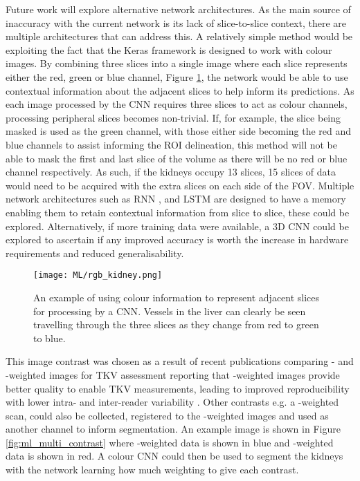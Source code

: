 Future work will explore alternative network architectures. As the main source of inaccuracy with the current network is its lack of slice-to-slice context, there are multiple architectures that can address this. A relatively simple method would be exploiting the fact that the Keras framework is designed to work with colour images. By combining three slices into a single image where each slice represents either the red, green or blue channel, Figure \ref{fig:ml_rgb_slices}, the network would be able to use contextual information about the adjacent slices to help inform its predictions. As each image processed by the \ac{CNN} requires three slices to act as colour channels, processing peripheral slices becomes non-trivial. If, for example, the slice being masked is used as the green channel, with those either side becoming the red and blue channels to assist informing the \ac{ROI} delineation, this method will not be able to mask the first and last slice of the volume as there will be no red or blue channel respectively. As such, if the kidneys occupy 13 slices, 15 slices of data would need to be acquired with the extra slices on each side of the \ac{FOV}. Multiple network architectures such as \ac{RNN} \cite{chen_combining_2016}, and \ac{LSTM} \cite{stollenga_parallel_2015} are designed to have a memory enabling them to retain contextual information from slice to slice, these could be explored. Alternatively, if more training data were available, a 3D \ac{CNN} could be explored to ascertain if any improved accuracy is worth the increase in hardware requirements and reduced generalisability.
 
\begin{figure}[H]
	\centering
	\texttt{[image: ML/rgb\_kidney.png]}
	\caption{An example of using colour information to represent adjacent slices for processing by a \ac{CNN}. Vessels in the liver can clearly be seen travelling through the three slices as they change from red to green to blue.}
	\label{fig:ml_rgb_slices}	
\end{figure}

This image contrast was chosen as a result of recent publications comparing \tone- and \ttwo-weighted images for \ac{TKV} assessment reporting that \ttwo-weighted images provide better quality to enable \ac{TKV} measurements, leading to improved reproducibility with lower intra- and inter-reader variability \cite{van_gastel_t1_2018}. Other contrasts e.g. a \tone-weighted scan, could also be collected, registered to the \ttwo-weighted images and used as another channel to inform segmentation. An example image is shown in Figure \ref{fig:ml_multi_contrast} where \tone-weighted data is shown in blue and \ttwo-weighted data is shown in red. A colour \ac{CNN} could then be used to segment the kidneys with the network learning how much weighting to give each contrast.

